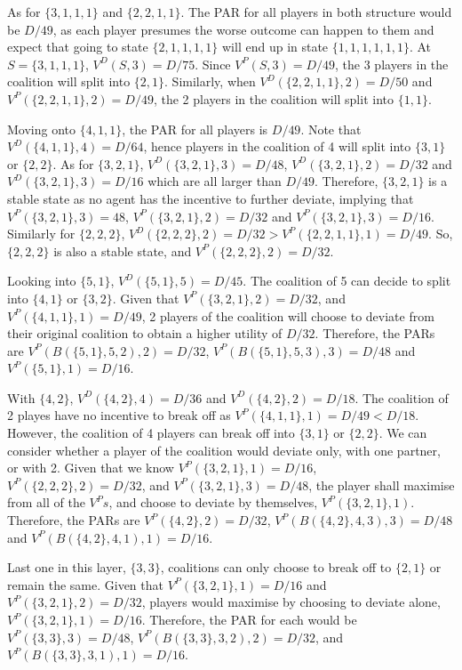 \documentclass[sigconf,anonymous]{aamas}
\begin{document}
As for $\{3, 1, 1, 1\}$ and $\{2, 2, 1, 1\}$. The PAR for all players in both structure would be $D/49$, as each player presumes the worse outcome can happen to them and expect that going to state $\{2, 1, 1, 1, 1\}$ will end up in state $\{1, 1, 1, 1, 1, 1\}$. At $S=\{3, 1, 1, 1\}$, $V^D(S, 3) = D/75$. Since $V^P(S, 3) = D/49$, the 3 players in the coalition will split into $\{2, 1\}$. Similarly, when $V^D(\{2, 2, 1, 1\}, 2) = D/50$ and $V^P(\{2, 2, 1, 1\}, 2) = D/49$, the 2 players in the coalition will split into $\{1, 1\}$. 

Moving onto $\{4, 1, 1\}$, the PAR for all players is $D/49$. Note that $V^D(\{4, 1, 1\}, 4) = D/64$, hence players in the coalition of 4 will split into $\{3, 1\}$ or $\{2, 2\}$. As for $\{3, 2, 1\}$, $V^D(\{3, 2, 1\}, 3) = D/48$, $V^D(\{3, 2, 1\}, 2) = D/32$ and $V^D(\{3, 2, 1\}, 3) = D/16$ which are all larger than $D/49$. Therefore, $\{3, 2, 1\}$ is a stable state as no agent has the incentive to further deviate, implying that $V^P(\{3, 2, 1\}, 3) = 48$, $V^P(\{3, 2, 1\}, 2) = D/32$ and $V^P(\{3, 2, 1\}, 3) = D/16$. Similarly for $\{2, 2, 2\}$, $V^D(\{2, 2, 2\}, 2) = D/32 > V^P(\{2, 2, 1, 1\}, 1) = D/49$. So, $\{2, 2, 2\}$ is also a stable state, and $V^P(\{2, 2, 2\}, 2) = D/32$. 

Looking into $\{5, 1\}$, $V^D(\{5, 1\}, 5) = D/45$. The coalition of 5 can decide to split into $\{4, 1\}$ or $\{3, 2\}$. Given that $V^P(\{3, 2, 1\}, 2) = D/32$, and $V^P(\{4, 1, 1\}, 1) = D/49$, 2 players of the coalition will choose to deviate from their original coalition to obtain a higher utility of $D/32$. Therefore, the PARs are $V^P(B(\{5, 1\}, 5, 2), 2) = D/32$, $V^P(B(\{5, 1\}, 5, 3), 3) = D/48$ and $V^P(\{5, 1\}, 1) = D/16$. 

With $\{4, 2\}$, $V^D(\{4, 2\}, 4) = D/36$ and $V^D(\{4, 2\}, 2) = D/18$. The coalition of 2 playes have no incentive to break off as $V^P(\{4, 1, 1\}, 1) = D/49 < D/18$. However, the coalition of 4 players can break off into $\{3, 1\}$ or $\{2, 2\}$. We can consider whether a player of the coalition would deviate only, with one partner, or with 2. Given that we know $V^P(\{3, 2, 1\}, 1) = D/16$, $V^P(\{2, 2, 2\}, 2) = D/32$, and $V^P(\{3, 2, 1\}, 3) = D/48$, the player shall maximise from all of the $V^Ps$, and choose to deviate by themselves, $V^P(\{3, 2, 1\}, 1)$. Therefore, the PARs are $V^P(\{4, 2\}, 2) = D/32$, $V^P(B(\{4, 2\}, 4, 3),3) = D/48$ and $V^P(B(\{4, 2\}, 4, 1), 1) = D/16$. 

Last one in this layer, $\{3, 3\}$, coalitions can only choose to break off to $\{2, 1\}$ or remain the same. Given that $V^P(\{3, 2, 1\}, 1) = D/16$ and $V^P(\{3, 2, 1\}, 2) = D/32$, players would maximise by choosing to deviate alone, $V^P(\{3, 2, 1\}, 1) = D/16$. Therefore, the PAR for each would be $V^P(\{3, 3\}, 3) = D/48$, $V^P(B(\{3, 3\}, 3, 2), 2) = D/32$, and $V^P(B(\{3, 3\}, 3, 1), 1) = D/16$. 
\end{document}
